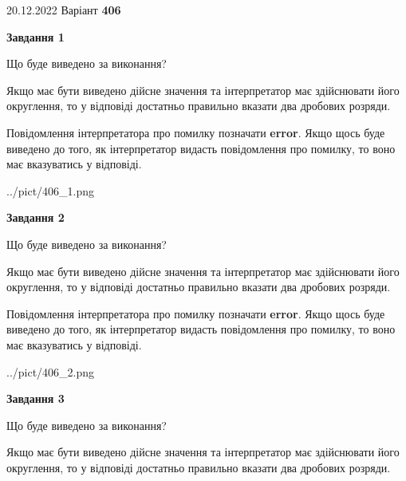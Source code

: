 \documentclass[12pt, ukrainian]{article}
\begin{document}
{20.12.2022 Варіант \No \textbf { 406 }\par}
{
\begin {Large}

{\begin {center}\textbf{Завдання 1}\end {center}}\par
Що буде виведено за виконання? \par

Якщо має бути виведено дійсне значення та інтерпретатор має здійснювати його округлення, 
то у відповіді достатньо правильно вказати два дробових розряди.

Повідомлення інтерпретатора про помилку позначати \textbf{error}.
Якщо щось буде виведено до того, як інтерпретатор видасть повідомлення про помилку, 
то воно має вказуватись у відповіді. \par

\begin{center}
	{../pict/406_1.png}
\end{center}
\newpage

{\begin {center}\textbf{Завдання 2}\end {center}}\par
Що буде виведено за виконання? \par

Якщо має бути виведено дійсне значення та інтерпретатор має здійснювати його округлення, 
то у відповіді достатньо правильно вказати два дробових розряди.

Повідомлення інтерпретатора про помилку позначати \textbf{error}.
Якщо щось буде виведено до того, як інтерпретатор видасть повідомлення про помилку, 
то воно має вказуватись у відповіді. \par

\begin{center}
	{../pict/406_2.png}
\end{center}
\newpage

{\begin {center}\textbf{Завдання 3}\end {center}}\par
Що буде виведено за виконання? \par

Якщо має бути виведено дійсне значення та інтерпретатор має здійснювати його округлення, 
то у відповіді достатньо правильно вказати два дробових розряди.


\end{Large}}
\end{document}
